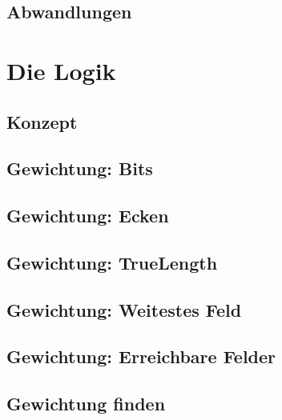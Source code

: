 \documentclass[12pt, draft]{beamer}
\begin{document}
\subsection{Abwandlungen} \begin{frame}\end{frame}

\section{Die Logik}
\subsection{Konzept} \begin{frame}\end{frame}
\subsection{Gewichtung: Bits} \begin{frame}\end{frame}
\subsection{Gewichtung: Ecken} \begin{frame}\end{frame}
\subsection{Gewichtung: TrueLength} \begin{frame}\end{frame}
\subsection{Gewichtung: Weitestes Feld} \begin{frame}\end{frame}
\subsection{Gewichtung: Erreichbare Felder} \begin{frame}\end{frame}
\subsection{Gewichtung finden} \begin{frame}\end{frame}
\end{document}
